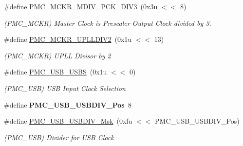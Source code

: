 \begin{DoxyCompactItemize}
\mbox{\label{group__SAME70__PMC_ga146ebfb5b80c79b85bb42a912d95801f}} 
\#define \mbox{\hyperlink{group__SAME70__PMC_ga146ebfb5b80c79b85bb42a912d95801f}{P\+M\+C\+\_\+\+M\+C\+K\+R\+\_\+\+M\+D\+I\+V\+\_\+\+P\+C\+K\+\_\+\+D\+I\+V3}}~(0x3u $<$$<$ 8)
\begin{DoxyCompactList}\small\item\em (P\+M\+C\+\_\+\+M\+C\+KR) Master Clock is Prescaler Output Clock divided by 3. \end{DoxyCompactList}\item 
\mbox{\label{group__SAME70__PMC_ga81cf9541c8611091050ddd024ef47e62}} 
\#define \mbox{\hyperlink{group__SAME70__PMC_ga81cf9541c8611091050ddd024ef47e62}{P\+M\+C\+\_\+\+M\+C\+K\+R\+\_\+\+U\+P\+L\+L\+D\+I\+V2}}~(0x1u $<$$<$ 13)
\begin{DoxyCompactList}\small\item\em (P\+M\+C\+\_\+\+M\+C\+KR) U\+P\+LL Divisor by 2 \end{DoxyCompactList}\item 
\mbox{\label{group__SAME70__PMC_ga0c8663e766b5d400fbd2e36964217aba}} 
\#define \mbox{\hyperlink{group__SAME70__PMC_ga0c8663e766b5d400fbd2e36964217aba}{P\+M\+C\+\_\+\+U\+S\+B\+\_\+\+U\+S\+BS}}~(0x1u $<$$<$ 0)
\begin{DoxyCompactList}\small\item\em (P\+M\+C\+\_\+\+U\+SB) U\+SB Input Clock Selection \end{DoxyCompactList}\item 
\mbox{\label{group__SAME70__PMC_gaa1bfcde618f6dc70280dfadd16dd7254}} 
\#define {\bfseries P\+M\+C\+\_\+\+U\+S\+B\+\_\+\+U\+S\+B\+D\+I\+V\+\_\+\+Pos}~8
\item 
\mbox{\label{group__SAME70__PMC_gabb062c3f15ab096e8ea86a30d4ba7293}} 
\#define \mbox{\hyperlink{group__SAME70__PMC_gabb062c3f15ab096e8ea86a30d4ba7293}{P\+M\+C\+\_\+\+U\+S\+B\+\_\+\+U\+S\+B\+D\+I\+V\+\_\+\+Msk}}~(0xfu $<$$<$ P\+M\+C\+\_\+\+U\+S\+B\+\_\+\+U\+S\+B\+D\+I\+V\+\_\+\+Pos)
\begin{DoxyCompactList}\small\item\em (P\+M\+C\+\_\+\+U\+SB) Divider for U\+SB Clock \end{DoxyCompactList}\item 

\end{DoxyCompactItemize}
